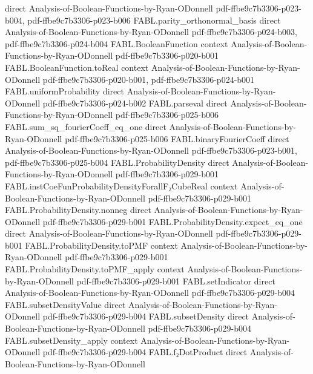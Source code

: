 \begin{theorem}
  {direct}
  {Analysis-of-Boolean-Functions-by-Ryan-ODonnell}
  {pdf-ffbe9c7b3306-p023-b004,
    pdf-ffbe9c7b3306-p023-b006}
\proofstep
  {FABL.parity_orthonormal_basis}
  {direct}
  {Analysis-of-Boolean-Functions-by-Ryan-ODonnell}
  {pdf-ffbe9c7b3306-p024-b003,
    pdf-ffbe9c7b3306-p024-b004}
\proofstep
  {FABL.BooleanFunction}
  {context}
  {Analysis-of-Boolean-Functions-by-Ryan-ODonnell}
  {pdf-ffbe9c7b3306-p020-b001}
\proofstep
  {FABL.BooleanFunction.toReal}
  {context}
  {Analysis-of-Boolean-Functions-by-Ryan-ODonnell}
  {pdf-ffbe9c7b3306-p020-b001,
    pdf-ffbe9c7b3306-p024-b001}
\proofstep
  {FABL.uniformProbability}
  {direct}
  {Analysis-of-Boolean-Functions-by-Ryan-ODonnell}
  {pdf-ffbe9c7b3306-p024-b002}
\proofstep
  {FABL.parseval}
  {direct}
  {Analysis-of-Boolean-Functions-by-Ryan-ODonnell}
  {pdf-ffbe9c7b3306-p025-b006}
\proofstep
  {FABL.sum_sq_fourierCoeff_eq_one}
  {direct}
  {Analysis-of-Boolean-Functions-by-Ryan-ODonnell}
  {pdf-ffbe9c7b3306-p025-b006}
\proofstep
  {FABL.binaryFourierCoeff}
  {direct}
  {Analysis-of-Boolean-Functions-by-Ryan-ODonnell}
  {pdf-ffbe9c7b3306-p023-b001,
    pdf-ffbe9c7b3306-p025-b004}
\proofstep
  {FABL.ProbabilityDensity}
  {direct}
  {Analysis-of-Boolean-Functions-by-Ryan-ODonnell}
  {pdf-ffbe9c7b3306-p029-b001}
\proofstep
  {FABL.instCoeFunProbabilityDensityForallF₂CubeReal}
  {context}
  {Analysis-of-Boolean-Functions-by-Ryan-ODonnell}
  {pdf-ffbe9c7b3306-p029-b001}
\proofstep
  {FABL.ProbabilityDensity.nonneg}
  {direct}
  {Analysis-of-Boolean-Functions-by-Ryan-ODonnell}
  {pdf-ffbe9c7b3306-p029-b001}
\proofstep
  {FABL.ProbabilityDensity.expect_eq_one}
  {direct}
  {Analysis-of-Boolean-Functions-by-Ryan-ODonnell}
  {pdf-ffbe9c7b3306-p029-b001}
\proofstep
  {FABL.ProbabilityDensity.toPMF}
  {context}
  {Analysis-of-Boolean-Functions-by-Ryan-ODonnell}
  {pdf-ffbe9c7b3306-p029-b001}
\proofstep
  {FABL.ProbabilityDensity.toPMF_apply}
  {context}
  {Analysis-of-Boolean-Functions-by-Ryan-ODonnell}
  {pdf-ffbe9c7b3306-p029-b001}
\proofstep
  {FABL.setIndicator}
  {direct}
  {Analysis-of-Boolean-Functions-by-Ryan-ODonnell}
  {pdf-ffbe9c7b3306-p029-b004}
\proofstep
  {FABL.subsetDensityValue}
  {direct}
  {Analysis-of-Boolean-Functions-by-Ryan-ODonnell}
  {pdf-ffbe9c7b3306-p029-b004}
\proofstep
  {FABL.subsetDensity}
  {direct}
  {Analysis-of-Boolean-Functions-by-Ryan-ODonnell}
  {pdf-ffbe9c7b3306-p029-b004}
\proofstep
  {FABL.subsetDensity_apply}
  {context}
  {Analysis-of-Boolean-Functions-by-Ryan-ODonnell}
  {pdf-ffbe9c7b3306-p029-b004}
\proofstep
  {FABL.f₂DotProduct}
  {direct}
  {Analysis-of-Boolean-Functions-by-Ryan-ODonnell}

\end{theorem}
